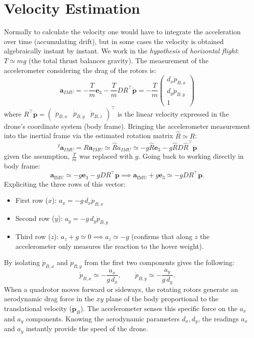 \documentclass[10pt, a4paper]{report}
\begin{document}
\section{Velocity Estimation}
Normally to calculate the velocity one would have to integrate the acceleration over time (accumulating drift), but in some cases the velocity is obtained algebraically instant by instant. We work in the \textit{hypothesis} of \textit{horizontal flight}: $T\simeq mg$ (the total thrust balances gravity). The measurement of the accelerometer considering the drag of the rotors is:\begin{equation}
    \mathbf a_{IMU}=-\frac{T}{m}\mathbf e_3-\frac{T}{m}DR^\top\dot{\mathbf p}=-\frac{T}{m}\begin{pmatrix}
        d_x\dot{ p}_{B,x}\\
        d_y\dot{ p}_{B,y}\\
        1
    \end{pmatrix}
\end{equation}
where $R^\top\dot{\mathbf p} = \begin{pmatrix}
    \dot{ p}_{B,x}& \dot{ p}_{B,y}& \dot{ p}_{B,z}
\end{pmatrix}^\top$ is the linear velocity expressed in the drone's coordinate system (body frame).
Bringing the accelerometer measurement into the inertial frame via the estimated rotation matrix $\hat{R} \simeq R$:\begin{equation}
    {}^I\mathbf a_{IMU}=R\mathbf a_{IMU}\simeq\hat Ra_{IMU}\simeq 
     -g \hat{R} \mathbf e_3 - g \hat{R} D \hat{R}^\top \dot{\mathbf p}
\end{equation}
given the assumption, $\frac{T}{m}$ was replaced with $g$. Going back to working directly in body frame:\begin{equation}
    \mathbf a_{\text{IMU}} \simeq -g \mathbf e_3 - g D R^\top \dot{\mathbf p} \implies\mathbf  a_{\text{IMU}} + g\mathbf  e_3 \simeq -g D R^\top \dot{\mathbf p}.
\end{equation}
Expliciting the three rows of this vector:\begin{itemize}
    \item First row ($x$): $a_x = -g \, d_x \dot{p}_{B,x}$
    \item Second row ($y$): $a_y = -g \, d_y \dot{p}_{B,y}$ 
    \item Third row ($z$): $a_z + g \simeq 0 \implies a_z \simeq -g$ (confirms that along $z$ the accelerometer only measures the reaction to the hover weight).
\end{itemize}
By isolating $\dot p_{B,x}$ and $\dot p_{B,y}$ from the first two components gives the following:\begin{equation}
    \dot p_{B,x} \simeq -\frac{a_x}{g\, d_x}, \qquad \dot p_{B,y} \simeq -\frac{a_y}{g\, d_y}.
\end{equation}
When a quadrotor moves forward or sideways, the rotating rotors generate an aerodynamic drag force in the $xy$ plane of the body proportional to the translational velocity ($\dot{\mathbf p}_B$). The accelerometer senses this specific force on the $a_x$ and $a_y$ components. Knowing the aerodynamic parameters $d_x, d_y$, the readings $a_x$ and $a_y$ instantly provide the speed of the drone.
\end{document}
